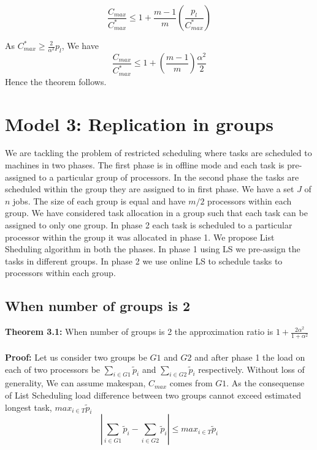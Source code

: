 \documentclass[10pt, conference, compsocconf]{IEEEtran}
\begin{document}
\begin{equation}\nonumber
\frac{C_{max}}{C_{max}^{*}} \leq 1 + {\frac{m-1}{m}}(\frac{p_l}{C_{max}^{*}})
\end{equation}

As $C_{max}^{*} \geq {\frac{2}{\alpha^{2}}} p_l $, We have \\

\begin{equation}\nonumber
\frac{C_{max}}{C_{max}^{*}} \leq 1 + (\frac{m-1}{m})\frac{\alpha^{2}}{2}
\end{equation}
Hence the theorem follows.   \\                            



\section{Model 3: Replication in groups}
We are tackling the  problem of restricted scheduling where tasks are scheduled to machines in two phases. The first phase is in offline mode and each task is pre-assigned to a particular  group of processors. In the second phase the tasks are scheduled  within the group they are assigned to in first phase.   We have a set $J$ of $ n$ jobs.  The size of each group is equal and have $m/2$ processors within each group.  We have considered task allocation in a group such that each task can be assigned to only one group.  In phase 2  each task is scheduled to a particular processor within the group it was allocated in phase 1.  We propose  List Sheduling algorithm in both the phases. In phase 1 using LS we pre-assign the tasks in different groups.  In phase 2 we use online LS to schedule tasks to processors within each group.

\subsection{When number of groups is 2}

\textbf{Theorem 3.1:} When number of groups is 2 the approximation ratio is $1 + \frac{2\alpha^{2}}{1+\alpha^{2}} $ \\
\\
\textbf{Proof:} 
 Let us consider two groups be $G1$ and $G2$ and after phase 1 the load on  each of two processors be $\sum_{i \in G1 }^{}{\tilde p_{i}}$ and $\sum_{i \in G2 }^{}{\tilde p_{i}}$ respectively. Without loss of generality, We can assume makespan, $C_{max}$ comes from $G1$.  As the consequense of List Scheduling load difference between two groups cannot exceed estimated longest task, ${max_{i \in T}}{\tilde p_{i}}$\\
\begin{equation}\nonumber
|\sum_{i \in G1 }^{}{\tilde p_{i}}- \sum_{i \in G2 }^{}{\tilde p_{i}}| \leq {max_{i \in T}}{\tilde p_{i}}\end{equation}
\end{document}
